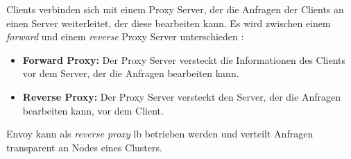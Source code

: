 Clients verbinden sich mit einem Proxy Server, der die Anfragen der Clients an einen Server weiterleitet, der diese bearbeiten kann. Es wird zwischen einem \textit{forward} und einem \textit{reverse} Proxy Server unterschieden \cite{WhatReverseProxy}:
\begin{itemize}
  \item \textbf{Forward Proxy:} Der Proxy Server versteckt die Informationen des Clients vor dem Server, der die Anfragen bearbeiten kann.
  \item \textbf{Reverse Proxy:} Der Proxy Server versteckt den Server, der die Anfragen bearbeiten kann, vor dem Client.
\end{itemize}
Envoy kann als \textit{reverse proxy} \acl{lb} betrieben werden und verteilt Anfragen transparent an Nodes eines Clusters.

\newpage
